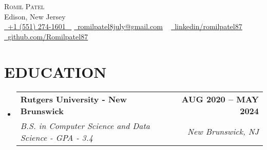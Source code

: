 \documentclass[letterpaper,11pt]{article}
\makeatletter
\newcommand{\resumeSubheading}[4]{
  \vspace{-2pt}\item
    \begin{tabular*}{1.0\textwidth}[t]{l@{\extracolsep{\fill}}r}
      \textbf{\large#1} & \textbf{\small #2} \\
      \textit{\large#3} & \textit{\small #4} \\   
    \end{tabular*}\vspace{-7pt}
}
\newcommand{\resumeSubHeadingListStart}{\begin{itemize}[leftmargin=0.0in, label={}]}
\newcommand{\resumeSubHeadingListEnd}{\end{itemize}}
\makeatother
\begin{document}
\begin{center}
    {\Huge \scshape Romil Patel} \\ \vspace{1pt}
    Edison, New Jersey \\ \vspace{1pt}
    \vspace{8pt}
    \small \href{tel:+1 (551) 274-1601}{ \raisebox{-0.1\height}\faPhone\ \underline{+1 (551) 274-1601} ~} \href{mailto:romilpatel8july@gmail.com}{\raisebox{-0.2\height}\faEnvelope\  \underline{romilpatel8july@gmail.com}} ~ 
    \href{https://www.linkedin.com/in/romilpatel87/}{\raisebox{-0.2\height}\faLinkedinSquare\ \underline{linkedin/romilpatel87}}  ~
    \href{https://github.com/Romilpatel87?tab=repositories}{\raisebox{-0.2\height}\faGithub\ \underline{github.com/Romilpatel87}} ~
    \vspace{6pt}
\end{center}
\section{EDUCATION}

  \resumeSubHeadingListStart
    \resumeSubheading
      {Rutgers University - New Brunswick}{AUG 2020 -- MAY 2024}
      {B.S. in Computer Science and Data Science - {GPA} - {3.4}}{New Brunswick, NJ}
  \resumeSubHeadingListEnd
\vspace{-8pt}
\end{document}
